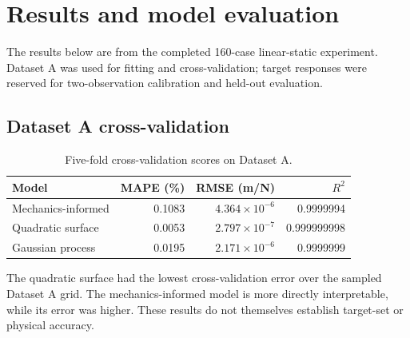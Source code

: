 \documentclass[11pt]{article}
\begin{document}
\section{Results and model evaluation}
The results below are from the completed 160-case linear-static experiment. Dataset A was used for fitting and cross-validation; target responses were reserved for two-observation calibration and held-out evaluation.
\subsection{Dataset A cross-validation}
\begin{table}[ht]
\centering
\caption{Five-fold cross-validation scores on Dataset A.}
\begin{tabular}{lrrr}
\toprule
Model & MAPE (\%) & RMSE (m/N) & $R^2$ \\
\midrule
Mechanics-informed & 0.1083 & $4.364\times10^{-6}$ & 0.9999994 \\
Quadratic surface & 0.0053 & $2.797\times10^{-7}$ & 0.999999998 \\
Gaussian process & 0.0195 & $2.171\times10^{-6}$ & 0.9999999 \\
\bottomrule
\end{tabular}
\end{table}
The quadratic surface had the lowest cross-validation error over the sampled Dataset A grid. The mechanics-informed model is more directly interpretable, while its error was higher. These results do not themselves establish target-set or physical accuracy.
\end{document}
